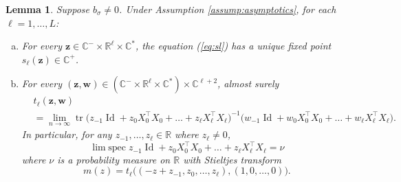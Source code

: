 \documentclass{article}
\newtheorem{lemma}[theorem]{Lemma}
\theoremstyle{definition}
\newcommand{\R}{\mathbb{R}}
\newcommand{\C}{\mathbb{C}}
\newcommand{\Id}{\operatorname{Id}}
\newcommand{\tr}{\operatorname{tr}}
\newcommand{\z}{\mathbf{z}}
\newcommand{\w}{\mathbf{w}}
\newcommand{\1}{\mathbf{1}}
\newcommand{\limspec}{\operatorname{lim\;spec}}
\begin{document}
\begin{lemma}\label{lemma:NTKextended}
Suppose $b_\sigma\neq 0$. Under Assumption \ref{assump:asymptotics}, for each $\ell=1,\ldots,L$:
\begin{enumerate}[(a)]
\item For every $\z \in \C^- \times \R^\ell \times \C^*$, the
equation (\ref{eq:sl}) has a unique fixed point $s_\ell(\z) \in \C^+$.
\item For every $(\z,\w) \in (\C^- \times \R^\ell \times \C^*) \times
\C^{\ell+2}$, almost surely
\begin{align}
&t_\ell(\z,\w)\nonumber\\
&=\lim_{n \to \infty}
\tr \Big(z_{-1}\Id+z_0 X_0^\top X_0+\ldots+z_\ell
X_\ell^\top X_\ell\Big)^{-1}\Big(w_{-1}\Id+w_0 X_0^\top X_0+\ldots+w_\ell
X_\ell^\top X_\ell\Big).\label{eq:tliscorrect}
\end{align}
In particular, for any $z_{-1},\ldots,z_\ell \in \R$ where $z_\ell \neq 0$,
\[\limspec z_{-1}\Id+z_0 X_0^\top X_0+\ldots+z_\ell
X_\ell^\top X_\ell=\nu\]
where $\nu$ is a probability measure on $\R$ with Stieltjes transform
\[m(z)=t_\ell\Big((-z+z_{-1},z_0,\ldots,z_\ell),(1,0,\ldots,0)\Big).\]
\end{enumerate}
\end{lemma}
\end{document}
